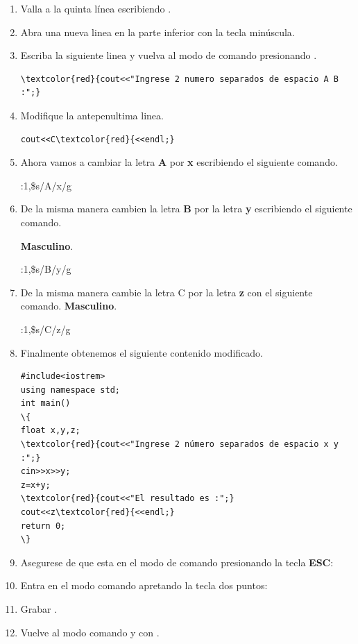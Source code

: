 \documentclass[a4paper,12pt,spanish]{article}
\begin{document}
\begin{enumerate}
\item Valla a la quinta línea escribiendo \fbox{\Large :}
.
\item Abra una nueva linea en la parte inferior con la tecla
 minúscula.
\item Escriba la siguiente linea y vuelva al modo de comando presionando 
.

\begin{Verbatim}[commandchars=\\\{\}]
\textcolor{red}{cout<<"Ingrese 2 numero separados de espacio A B :";}
\end{Verbatim}

\item Modifique la antepenultima linea.

\begin{Verbatim}[commandchars=\\\{\}]
cout<<C\textcolor{red}{<<endl;}
\end{Verbatim}


  

\item Ahora vamos a cambiar la letra  \textbf{A}  por \textbf{x} escribiendo el siguiente
comando.
    \begin{tcolorbox}[colback=gray!5]
   {\Large :1,\$s/A/x/g}
  \end{tcolorbox}

 
\item De la misma manera cambien la letra \textbf{B}  por la letra \textbf{y} escribiendo el siguiente comando.
  
\textbf{Masculino}.
    \begin{tcolorbox}[colback=gray!5]
   {\Large :1,\$s/B/y/g}
  \end{tcolorbox}


\item De la misma manera cambie la  letra \textsf{C} por la letra \textbf{z} con el siguiente comando.
\textbf{Masculino}.
    \begin{tcolorbox}[colback=gray!5]
   {\Large :1,\$s/C/z/g}
  \end{tcolorbox}

\item Finalmente obtenemos el siguiente contenido modificado.
  
\begin{Verbatim}[commandchars=\\\{\}]
#include<iostrem>
using namespace std;
int main()
\{
float x,y,z;
\textcolor{red}{cout<<"Ingrese 2 número separados de espacio x y :";}
cin>>x>>y;
z=x+y;
\textcolor{red}{cout<<"El resultado es :";}
cout<<z\textcolor{red}{<<endl;}
return 0;
\}
\end{Verbatim}
\item Asegurese de que esta en el modo de comando presionando la tecla \textbf{ESC}:
\item Entra en el modo comando apretando la tecla dos puntos:
\item Grabar .
\item Vuelve al modo comando y con \fbox{\Large :} .


\end{enumerate}
\end{document}
